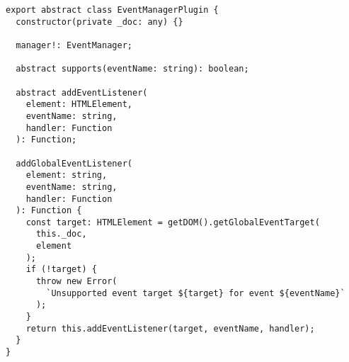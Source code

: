 \begin{verbatim}
export abstract class EventManagerPlugin {
  constructor(private _doc: any) {}

  manager!: EventManager;

  abstract supports(eventName: string): boolean;

  abstract addEventListener(
    element: HTMLElement,
    eventName: string,
    handler: Function
  ): Function;

  addGlobalEventListener(
    element: string,
    eventName: string,
    handler: Function
  ): Function {
    const target: HTMLElement = getDOM().getGlobalEventTarget(
      this._doc,
      element
    );
    if (!target) {
      throw new Error(
        `Unsupported event target ${target} for event ${eventName}`
      );
    }
    return this.addEventListener(target, eventName, handler);
  }
}
\end{verbatim}
